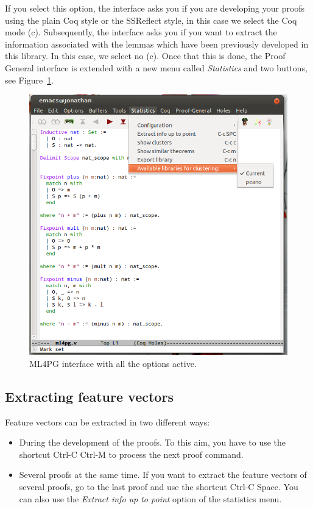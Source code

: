 \documentclass[10pt]{article}
\begin{document}
If you select this option, the interface asks you if you are developing your proofs using the plain Coq style or the SSReflect style, in this case we select the Coq mode (c). 
Subsequently, the interface asks you if you want to extract the information associated with the lemmas which have been previously developed in this library. In this case,
we select no (c). Once that this is done, the Proof General interface is extended with a new menu called \emph{Statistics} and two buttons, see Figure~\ref{fig3}.

\begin{figure}
 \centering
 \includegraphics[scale=0.4]{images/fig3.png}
 \caption{ML4PG interface with all the options active.}\label{fig3}
\end{figure}


\subsection{Extracting feature vectors}

Feature vectors can be extracted in two different ways:

\begin{itemize}
 \item During the development of the proofs. To this aim, you have to use the shortcut Ctrl-C Ctrl-M to process the next proof command.
 \item Several proofs at the same time. If you want to extract the feature vectors of several proofs, go to the last proof and use the shortcut Ctrl-C Space. 
       You can also use the \emph{Extract info up to point} option of the statistics menu. 
\end{itemize}
\end{document}
